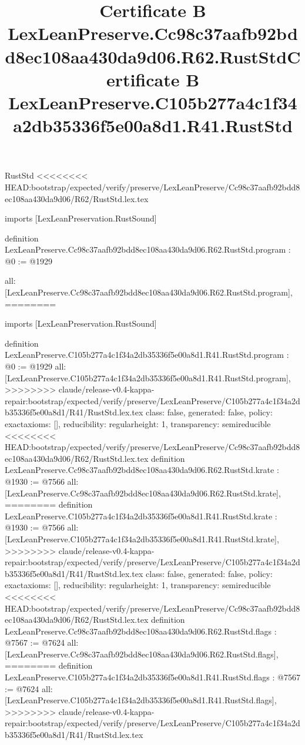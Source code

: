 \begin{lexlean}{RustStd}
<<<<<<<< HEAD:bootstrap/expected/verify/preserve/LexLeanPreserve/Cc98c37aafb92bdd8ec108aa430da9d06/R62/RustStd.lex.tex
\title{Certificate B LexLeanPreserve.Cc98c37aafb92bdd8ec108aa430da9d06.R62.RustStd}
\begin{coremodule}
imports [LexLeanPreservation.RustSound]

definition LexLeanPreserve.Cc98c37aafb92bdd8ec108aa430da9d06.R62.RustStd.program : @0 := @1929 {
  all: [LexLeanPreserve.Cc98c37aafb92bdd8ec108aa430da9d06.R62.RustStd.program],
========
\title{Certificate B LexLeanPreserve.C105b277a4c1f34a2db35336f5e00a8d1.R41.RustStd}
\begin{coremodule}
imports [LexLeanPreservation.RustSound]

definition LexLeanPreserve.C105b277a4c1f34a2db35336f5e00a8d1.R41.RustStd.program : @0 := @1929 {
  all: [LexLeanPreserve.C105b277a4c1f34a2db35336f5e00a8d1.R41.RustStd.program],
>>>>>>>> claude/release-v0.4-kappa-repair:bootstrap/expected/verify/preserve/LexLeanPreserve/C105b277a4c1f34a2db35336f5e00a8d1/R41/RustStd.lex.tex
  class: false,
  generated: false,
  policy: exact{axioms: []},
  reducibility: regular{height: 1},
  transparency: semireducible
}
<<<<<<<< HEAD:bootstrap/expected/verify/preserve/LexLeanPreserve/Cc98c37aafb92bdd8ec108aa430da9d06/R62/RustStd.lex.tex
definition LexLeanPreserve.Cc98c37aafb92bdd8ec108aa430da9d06.R62.RustStd.krate : @1930 := @7566 {
  all: [LexLeanPreserve.Cc98c37aafb92bdd8ec108aa430da9d06.R62.RustStd.krate],
========
definition LexLeanPreserve.C105b277a4c1f34a2db35336f5e00a8d1.R41.RustStd.krate : @1930 := @7566 {
  all: [LexLeanPreserve.C105b277a4c1f34a2db35336f5e00a8d1.R41.RustStd.krate],
>>>>>>>> claude/release-v0.4-kappa-repair:bootstrap/expected/verify/preserve/LexLeanPreserve/C105b277a4c1f34a2db35336f5e00a8d1/R41/RustStd.lex.tex
  class: false,
  generated: false,
  policy: exact{axioms: []},
  reducibility: regular{height: 1},
  transparency: semireducible
}
<<<<<<<< HEAD:bootstrap/expected/verify/preserve/LexLeanPreserve/Cc98c37aafb92bdd8ec108aa430da9d06/R62/RustStd.lex.tex
definition LexLeanPreserve.Cc98c37aafb92bdd8ec108aa430da9d06.R62.RustStd.flags : @7567 := @7624 {
  all: [LexLeanPreserve.Cc98c37aafb92bdd8ec108aa430da9d06.R62.RustStd.flags],
========
definition LexLeanPreserve.C105b277a4c1f34a2db35336f5e00a8d1.R41.RustStd.flags : @7567 := @7624 {
  all: [LexLeanPreserve.C105b277a4c1f34a2db35336f5e00a8d1.R41.RustStd.flags],
>>>>>>>> claude/release-v0.4-kappa-repair:bootstrap/expected/verify/preserve/LexLeanPreserve/C105b277a4c1f34a2db35336f5e00a8d1/R41/RustStd.lex.tex
}}}
\end{coremodule}}
\end{coremodule}
\end{lexlean}
